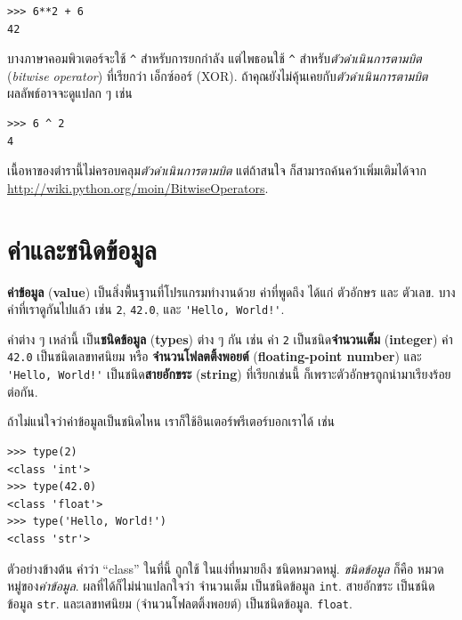 \begin{verbatim}
>>> 6**2 + 6
42
\end{verbatim}
%
บางภาษาคอมพิวเตอร์จะใช้ \verb"^" สำหรับการยกกำลัง
แต่ไพธอนใช้ \verb"^" สำหรับ\textit{ตัวดำเนินการตามบิต} (\textit{bitwise operator}) ที่เรียกว่า เอ็กซ์ออร์ (XOR).  
ถ้าคุณยังไม่คุ้นเคยกับ\textit{ตัวดำเนินการตามบิต} 
ผลลัพธ์อาจจะดูแปลก ๆ เช่น

\begin{verbatim}
>>> 6 ^ 2
4
\end{verbatim}
%
เนื้อหาของตำรานี้ไม่ครอบคลุม\textit{ตัวดำเนินการตามบิต}
แต่ถ้าสนใจ ก็สามารถค้นคว้าเพิ่มเติมได้จาก \url{http://wiki.python.org/moin/BitwiseOperators}.

\section{ค่าและชนิดข้อมูล}

\textbf{ค่าข้อมูล} (\textbf{value}) เป็นสิ่งพื้นฐานที่โปรแกรมทำงานด้วย
ค่าที่พูดถึง ได้แก่ ตัวอักษร และ ตัวเลข.
บางค่าที่เราดูกันไปแล้ว เช่น  
\texttt{2},
\texttt{42.0}, และ \verb"'Hello, World!'".

ค่าต่าง ๆ เหล่านี้ เป็น\textbf{ชนิดข้อมูล} (\textbf{types}) ต่าง ๆ กัน
เช่น
ค่า \texttt{2} เป็นชนิด\textbf{จำนวนเต็ม} (\textbf{integer})
ค่า \texttt{42.0} เป็นชนิดเลขทศนิยม หรือ
\textbf{จำนวนโฟลตติ้งพอยต์} (\textbf{floating-point number})
และ \verb"'Hello, World!'" เป็นชนิด\textbf{สายอักขระ} (\textbf{string})
ที่เรียกเช่นนี้ ก็เพราะตัวอักษรถูกนำมาเรียงร้อยต่อกัน.

ถ้าไม่แน่ใจว่าค่าข้อมูลเป็นชนิดไหน เราก็ใช้อินเตอร์พรีเตอร์บอกเราได้ เช่น

\begin{verbatim}
>>> type(2)
<class 'int'>
>>> type(42.0)
<class 'float'>
>>> type('Hello, World!')
<class 'str'>
\end{verbatim}
%
ตัวอย่างข้างต้น คำว่า ``class'' ในที่นี้ ถูกใช้ ในแง่ที่หมายถึง ชนิดหมวดหมู่.
\textit{ชนิดข้อมูล} ก็คือ หมวดหมู่ของ\textit{ค่าข้อมูล}.
%
ผลที่ได้ก็ไม่น่าแปลกใจว่า จำนวนเต็ม เป็นชนิดข้อมูล \texttt{int}.
สายอักขระ เป็นชนิดข้อมูล \texttt{str}.
และเลขทศนิยม (จำนวนโฟลตติ้งพอยต์) เป็นชนิดข้อมูล. \texttt{float}.  

